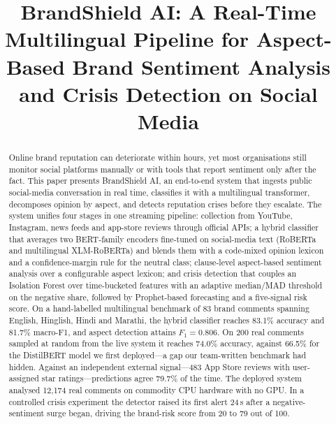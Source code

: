 \documentclass[conference]{IEEEtran}
\begin{document}
\title{BrandShield AI: A Real-Time Multilingual Pipeline for Aspect-Based
Brand Sentiment Analysis and Crisis Detection on Social Media}

\author{
\and
{}
}

\maketitle

\begin{abstract}
Online brand reputation can deteriorate within hours, yet most organisations still
monitor social platforms manually or with tools that report sentiment only after the
fact. This paper presents BrandShield AI, an end-to-end system that ingests public
social-media conversation in real time, classifies it with a multilingual transformer,
decomposes opinion by aspect, and detects reputation crises before they escalate. The
system unifies four stages in one streaming pipeline: collection from YouTube,
Instagram, news feeds and app-store reviews through official APIs; a hybrid classifier
that averages two BERT-family encoders fine-tuned on social-media text (RoBERTa and
multilingual XLM-RoBERTa) and blends them with a code-mixed opinion lexicon and a
confidence-margin rule for the neutral class; clause-level aspect-based sentiment
analysis over a configurable aspect lexicon; and crisis detection that couples an
Isolation Forest over time-bucketed features with an adaptive median/MAD threshold on
the negative share, followed by Prophet-based forecasting and a five-signal risk score.
On a hand-labelled multilingual benchmark of 83 brand comments spanning English,
Hinglish, Hindi and Marathi, the hybrid classifier reaches 83.1\% accuracy and 81.7\%
macro-F1, and aspect detection attains $F_1 = 0.806$. On 200 real comments sampled at random
from the live system it reaches 74.0\% accuracy, against 66.5\% for the DistilBERT
model we first deployed---a gap our team-written benchmark had hidden. Against an
independent external signal---483 App Store reviews with user-assigned star
ratings---predictions agree 79.7\% of the time. The deployed system analysed
12{,}174 real comments on commodity CPU hardware with no GPU. In a controlled crisis experiment the detector raised its first
alert 24\,s after a negative-sentiment surge began, driving the brand-risk score from 20 to
79 out of 100.
\end{abstract}
\end{document}
